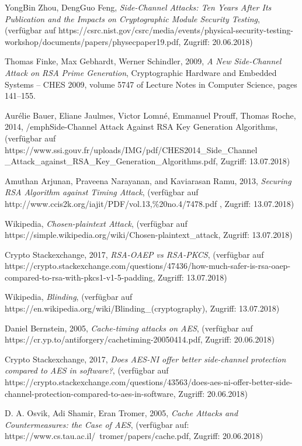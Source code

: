 \documentclass[conference,10pt,a4paper,twocolumn]{IEEEtran}
\begin{document}
\begin{thebibliography}{1}
YongBin Zhou, DengGuo Feng, \emph{Side-Channel Attacks: Ten Years After Its Publication and the Impacts on Cryptographic Module Security Testing}, (verfügbar auf https://csrc.nist.gov/csrc/media/events/physical-security-testing-workshop/documents/papers/physecpaper19.pdf, Zugriff: 20.06.2018)

Thomas Finke, Max Gebhardt, Werner Schindler, 2009, \emph{A New Side-Channel Attack
on RSA Prime Generation}, Cryptographic Hardware and Embedded Systems – CHES 2009, volume 5747 of Lecture Notes in Computer Science, pages 141–155.

Aurélie Bauer, Eliane Jaulmes, Victor Lomné, Emmanuel Prouff, Thomas Roche, 2014, /emph{Side-Channel Attack Against RSA Key Generation Algorithms}, (verfügbar auf https://www.ssi.gouv.fr/uploads/IMG/pdf/CHES2014{\_}Side{\_}Channel
{\_}Attack{\_}against{\_}RSA{\_}Key{\_}Generation{\_}Algorithms.pdf, Zugriff: 13.07.2018)

Amuthan Arjunan, Praveena Narayanan, and Kaviarasan Ramu, 2013, \emph{Securing RSA Algorithm against Timing Attack}, (verfügbar auf http://www.ccis2k.org/iajit/PDF/vol.13,{\%}20no.4/7478.pdf , Zugriff: 13.07.2018)

Wikipedia, \emph{Chosen-plaintext Attack}, (verfügbar auf https://simple.wikipedia.org/wiki/Chosen-plaintext{\_}attack, Zugriff: 13.07.2018)

Crypto Stackexchange, 2017, \emph{RSA-OAEP vs RSA-PKCS}, (verfügbar auf https://crypto.stackexchange.com/questions/47436/how-much-safer-is-rsa-oaep-compared-to-rsa-with-pkcs1-v1-5-padding, Zugriff: 13.07.2018)

Wikipedia, \emph{Blinding}, (verfügbar auf https://en.wikipedia.org/wiki/Blinding{\_}(cryptography), Zugriff: 13.07.2018)

Daniel Bernstein, 2005, \emph{Cache-timing attacks on AES}, (verfügbar auf https://cr.yp.to/antiforgery/cachetiming-20050414.pdf, Zugriff: 20.06.2018)

Crypto Stackexchange, 2017, \emph{Does AES-NI offer better side-channel protection compared to AES in software?}, (verfügbar auf https://crypto.stackexchange.com/questions/43563/does-aes-ni-offer-better-side-channel-protection-compared-to-aes-in-software, Zugriff: 20.06.2018)

D. A. Osvik, Adi Shamir, Eran Tromer, 2005, \emph{Cache Attacks and Countermeasures: the Case of AES}, (verfügbar auf: https://www.cs.tau.ac.il/~tromer/papers/cache.pdf, Zugriff: 20.06.2018)


\end{thebibliography}
\end{document}
